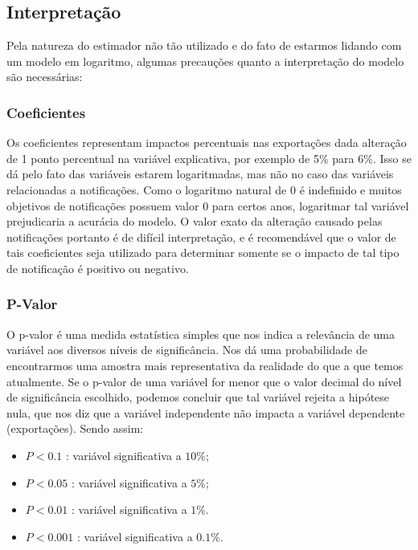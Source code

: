 \documentclass[12pt, a4paper]{article}
\begin{document}
\subsection{Interpretação}

Pela natureza do estimador não tão utilizado e do fato de estarmos lidando com um modelo em logaritmo, algumas precauções quanto a interpretação do modelo são necessárias:

\subsubsection{Coeficientes}

Os coeficientes representam impactos percentuais nas exportações dada alteração de 1 ponto percentual na variável explicativa, por exemplo de 5\% para 6\%. Isso se dá pelo fato das variáveis estarem logaritmadas, mas não no caso das variáveis relacionadas a notificações. Como o logaritmo natural de 0 é indefinido e muitos objetivos de notificações possuem valor 0 para certos anos, logaritmar tal variável prejudicaria a acurácia do modelo. O valor exato da alteração causado pelas notificações portanto é de difícil interpretação, e é recomendável que o valor de tais coeficientes seja utilizado para determinar somente se o impacto de tal tipo de notificação é positivo ou negativo.

\subsubsection{P-Valor}
O p-valor é uma medida estatística simples que nos indica a relevância de uma variável aos diversos níveis de significância. Nos dá uma probabilidade de encontrarmos uma amostra mais representativa da realidade do que a que temos atualmente. Se o p-valor de uma variável for menor que o valor decimal do nível de significância escolhido, podemos concluir que tal variável rejeita a hipótese nula, que nos diz que a variável independente não impacta a variável dependente (exportações). Sendo assim:

\begin{itemize}
    \item $P < 0.1$ : variável significativa a $10\%$;
    \item $P < 0.05$ : variável significativa a $5\%$;
    \item $P < 0.01$ : variável significativa a $1\%$.
    \item $P < 0.001$ : variável significativa a $0.1\%$.
\end{itemize}
\end{document}
